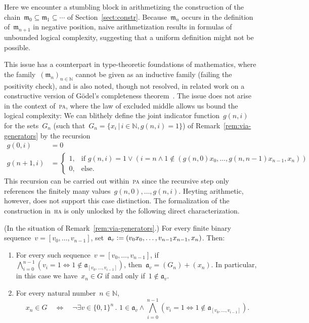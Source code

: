 \documentclass[envcountsect,envcountsame,runningheads]{llncs}
\newcommand{\aaa}{\mathfrak{a}}
\newcommand{\mmm}{\mathfrak{m}}
\newcommand{\NN}{\mathbb{N}}
\newcommand{\defeq}{\vcentcolon=}
\renewcommand{\_}{\mathpunct{.}\,}
\begin{document}
Here we encounter a stumbling block in arithmetizing the
construction of the chain~$\mmm_0 \subseteq \mmm_1 \subseteq \cdots$
of Section~\ref{sect:constr}. Because~$\mmm_n$ occurs in the
definition of~$\mmm_{n+1}$ in negative position, naive arithmetization
results in formulas of unbounded logical complexity, suggesting that
a uniform definition might not be possible.

This issue has a counterpart in type-theoretic foundations of mathematics,
where the family~$(\mmm_n)_{n \in \NN}$ cannot be given as an inductive family
(failing the positivity check), and is also noted, though not resolved, in
related work on a constructive version of Gödel's completeness
theorem~\cite[p.~11]{herbelin-ilik:henkin}.
The issue does not arise in the context of~\textsc{pa}, where the law of
excluded middle allows us bound the logical complexity: We can blithely define
the joint indicator function~$g(n,i)$ for the sets~$G_n$ (such that~$G_n = \{
x_i \,|\, i \in \NN, g(n,i) = 1 \}$) of Remark~\ref{rem:via-generators} by the recursion
\begin{align*}
  g(0,i) &= 0 \\
  g(n+1,i) &= \begin{cases}
    1, & \text{if $g(n,i) = 1 \vee (i = n \wedge 1 \not\in
    (g(n,0)x_0,\ldots,g(n,n-1)x_{n-1},x_n))$} \\
    0, & \text{else.}
  \end{cases}
\end{align*}
This recursion can be carried out within~\textsc{pa} since the recursive step
only references the finitely many values~$g(n,0),\ldots,g(n,i)$.
Heyting arithmetic, however, does not support this case distinction. The
formalization of the construction in~\textsc{ha} is only unlocked by the following
direct characterization.

\begin{lemma}\label{lemma:uniform-char}(In the situation of Remark~\ref{rem:via-generators}.)
For every finite binary sequence~$v = [v_0,\ldots,v_{n-1}]$, set~$\aaa_v
\defeq (v_0x_0,\ldots,v_{n-1}x_{n-1},x_n)$. Then:
\begin{enumerate}
\item For every such sequence~$v = [v_0,\ldots,v_{n-1}]$, if
$\bigwedge_{i=0}^{n-1} (v_i = 1 \Leftrightarrow 1 \not\in \aaa_{[v_0,\ldots,v_{i-1}]})$,
then~$\aaa_v = (G_n) + (x_n)$.
In particular, in this case we have~$x_n \in G$ if and only if~$1 \not\in \aaa_v$.
\item For every natural number~$n \in \NN$,
\vspace*{-1.2em}
\[ x_n \in G \quad\Longleftrightarrow\quad \neg
  \exists v \in \{0,1\}^n\_
    1 \in \aaa_v \wedge
      \bigwedge_{i=0}^{n-1} (v_i = 1 \Leftrightarrow 1 \not\in \aaa_{[v_0,\ldots,v_{i-1}]}). \]
\end{enumerate}
\end{lemma}
\end{document}
